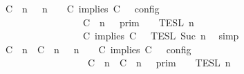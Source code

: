 \begin{isabellebody}
\ {\isacartoucheopen}{\isasymlbrakk}\ {\isacharparenleft}{\isacharparenleft}C\ {\isasymnot}{\isasymUp}\ n{\isacharparenright}\ {\isacharhash}\ {\isasymGamma}{\isacharparenright}{\isacharcomma}\ n\ {\isasymturnstile}\ {\isasymPsi}\ {\isasymtriangleright}\ {\isacharparenleft}{\isacharparenleft}C\ implies\ C\ {\isacharhash}\ {\isasymPhi}{\isacharparenright}\ {\isasymrbrakk}\isactrlsub c\isactrlsub o\isactrlsub n\isactrlsub f\isactrlsub i\isactrlsub g\isanewline
\ \ \ \ \ \ \ \ \ \ \ \ \ \ \ \ {\isacharequal}\ {\isasymlbrakk}{\isasymlbrakk}\ {\isacharparenleft}C\ {\isasymnot}{\isasymUp}\ n{\isacharparenright}\ {\isacharhash}\ {\isasymGamma}\ {\isasymrbrakk}{\isasymrbrakk}\isactrlsub p\isactrlsub r\isactrlsub i\isactrlsub m\ {\isasyminter}\ {\isasymlbrakk}{\isasymlbrakk}\ {\isasymPsi}\ {\isasymrbrakk}{\isasymrbrakk}\isactrlsub T\isactrlsub E\isactrlsub S\isactrlsub L\isactrlbsup {\isasymge}\ n\isactrlesup \isanewline
\ \ \ \ \ \ \ \ \ \ \ \ \ \ \ \ {\isasyminter}\ {\isasymlbrakk}{\isasymlbrakk}\ {\isacharparenleft}C\ implies\ C\ {\isacharhash}\ {\isasymPhi}\ {\isasymrbrakk}{\isasymrbrakk}\isactrlsub T\isactrlsub E\isactrlsub S\isactrlsub L\isactrlbsup {\isasymge}\ Suc\ n\isactrlesup {\isacartoucheclose}\ \isamarkupfalse%
\ simp\isanewline
\ \ \isamarkupfalse%
\ \isamarkupfalse%
\ {\isacartoucheopen}{\isasymlbrakk}\ {\isacharparenleft}{\isacharparenleft}C\ {\isasymUp}\ n{\isacharparenright}\ {\isacharhash}\ {\isacharparenleft}C\ {\isasymUp}\ n{\isacharparenright}\ {\isacharhash}\ {\isasymGamma}{\isacharparenright}{\isacharcomma}\ n\ {\isasymturnstile}\ {\isasymPsi}\ {\isasymtriangleright}\ {\isacharparenleft}{\isacharparenleft}C\ implies\ C\ {\isacharhash}\ {\isasymPhi}{\isacharparenright}\ {\isasymrbrakk}\isactrlsub c\isactrlsub o\isactrlsub n\isactrlsub f\isactrlsub i\isactrlsub g\isanewline
\ \ \ \ \ \ \ \ \ \ \ \ \ \ \ \ {\isacharequal}\ \ {\isasymlbrakk}{\isasymlbrakk}\ {\isacharparenleft}{\isacharparenleft}C\ {\isasymUp}\ n{\isacharparenright}\ {\isacharhash}\ {\isacharparenleft}C\ {\isasymUp}\ n{\isacharparenright}\ {\isacharhash}\ {\isasymGamma}{\isacharparenright}\ {\isasymrbrakk}{\isasymrbrakk}\isactrlsub p\isactrlsub r\isactrlsub i\isactrlsub m\ {\isasyminter}\ {\isasymlbrakk}{\isasymlbrakk}\ {\isasymPsi}\ {\isasymrbrakk}{\isasymrbrakk}\isactrlsub T\isactrlsub E\isactrlsub S\isactrlsub L\isactrlbsup {\isasymge}\ n\isactrlesup \isanewline

\end{isabellebody}
